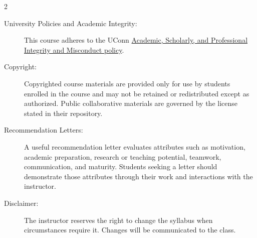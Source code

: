 \documentclass{article}
\begin{document}
\begin{multicols}{2}
\begin{description}
\item[University Policies and Academic Integrity:]
  This course adheres to the UConn
  \href{https://policy.uconn.edu/2023/07/11/academic-scholarly-and-professional-integrity-and-misconduct-aspim-policy-on/}{Academic,
  Scholarly, and Professional Integrity and Misconduct policy}.

\item[Copyright:]
  Copyrighted course materials are provided only for use by students enrolled
  in the course and may not be retained or redistributed except as authorized.
  Public collaborative materials are governed by the license stated in their
  repository.

\item[Recommendation Letters:]
  A useful recommendation letter evaluates attributes such as motivation,
  academic preparation, research or teaching potential, teamwork,
  communication, and maturity. Students seeking a letter should demonstrate
  those attributes through their work and interactions with the instructor.

\item[Disclaimer:]
  The instructor reserves the right to change the syllabus when circumstances
  require it. Changes will be communicated to the class.
\end{description}
\end{multicols}
\end{document}
